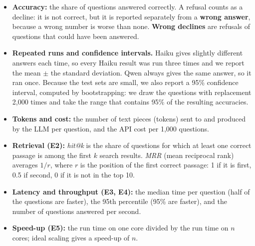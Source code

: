 \begin{itemize}
  \item \textbf{Accuracy:} the share of questions answered correctly. A refusal counts as a decline:
        it is not correct, but it is reported separately from a \textbf{wrong answer}, because a
        wrong number is worse than none. \textbf{Wrong declines} are refusals of questions that could
        have been answered.
  \item \textbf{Repeated runs and confidence intervals.} Haiku gives slightly different answers each
        time, so every Haiku result was run three times and we report the mean $\pm$ the standard
        deviation. Qwen always gives the same answer, so it ran once. Because the test sets are
        small, we also report a 95\% confidence interval, computed by bootstrapping: we draw the
        questions with replacement 2,000 times and take the range that contains 95\% of the
        resulting accuracies.
  \item \textbf{Tokens and cost:} the number of text pieces (tokens) sent to and produced by the LLM per
        question, and the API cost per 1,000 questions.
  \item \textbf{Retrieval (E2):} \emph{hit@k} is the share of questions for which at least one correct
        passage is among the first $k$ search results. \emph{MRR} (mean reciprocal rank) averages
        $1/r$, where $r$ is the position of the first correct passage: 1 if it is first, 0.5 if
        second, 0 if it is not in the top 10.
  \item \textbf{Latency and throughput (E3, E4):} the median time per question (half of the questions
        are faster), the 95th percentile (95\% are faster), and the number of questions answered per
        second.
  \item \textbf{Speed-up (E5):} the run time on one core divided by the run time on $n$ cores; ideal
        scaling gives a speed-up of $n$.
\end{itemize}
